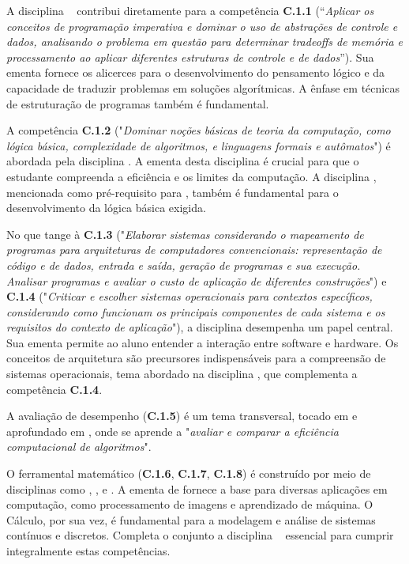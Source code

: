 A disciplina \textbf{\AlgComp}~ contribui diretamente para a competência \textbf{C.1.1} (``\textit{Aplicar os conceitos de programação imperativa e dominar o uso de abstrações de controle e dados, analisando o problema em questão para determinar tradeoffs de memória e processamento ao aplicar diferentes estruturas de controle e de dados}''). Sua ementa fornece os alicerces para o desenvolvimento do pensamento lógico e da capacidade de traduzir problemas em soluções algorítmicas. A ênfase em técnicas de estruturação de programas também é fundamental.

A competência \textbf{C.1.2} ("\textit{Dominar noções básicas de teoria da computação, como lógica básica, complexidade de algoritmos, e linguagens formais e autômatos}") é abordada pela disciplina \textbf{\AnAlg}. A ementa desta disciplina é crucial para que o estudante compreenda a eficiência e os limites da computação. A disciplina \textbf{\LogProg}, mencionada como pré-requisito para \textbf{\AnAlg}, também é fundamental para o desenvolvimento da lógica básica exigida.

No que tange à \textbf{C.1.3} ("\textit{Elaborar sistemas considerando o mapeamento de programas para arquiteturas de computadores convencionais: representação de código e de dados, entrada e saída, geração de programas e sua execução. Analisar programas e avaliar o custo de aplicação de diferentes construções}") e \textbf{C.1.4} ("\textit{Criticar e escolher sistemas operacionais para contextos específicos, considerando como funcionam os principais componentes de cada sistema e os requisitos do contexto de aplicação}"), a disciplina \textbf{\ArqComp} desempenha um papel central. Sua ementa permite ao aluno entender a interação entre software e hardware.  Os conceitos de arquitetura são precursores indispensáveis para a compreensão de sistemas operacionais, tema abordado na disciplina \textbf{\ProjSO}, que complementa a competência \textbf{C.1.4}.

A avaliação de desempenho (\textbf{C.1.5}) é um tema transversal, tocado em \textbf{\ArqComp} e aprofundado em \textbf{\AnAlg}, onde se aprende a "\textit{avaliar e comparar a eficiência computacional de algoritmos}".

O ferramental matemático (\textbf{C.1.6}, \textbf{C.1.7}, \textbf{C.1.8}) é construído por meio de disciplinas como \textbf{\CalcI}, \textbf{\CalcII}, \textbf{\CalcIII} e \textbf{\AlgLin}. A ementa de \textbf{\AlgLin} fornece a base para diversas aplicações em computação, como processamento de imagens e aprendizado de máquina. O Cálculo, por sua vez, é fundamental para a modelagem e análise de sistemas contínuos e discretos. Completa o conjunto a disciplina \ProbEst~ essencial para cumprir integralmente estas competências.

